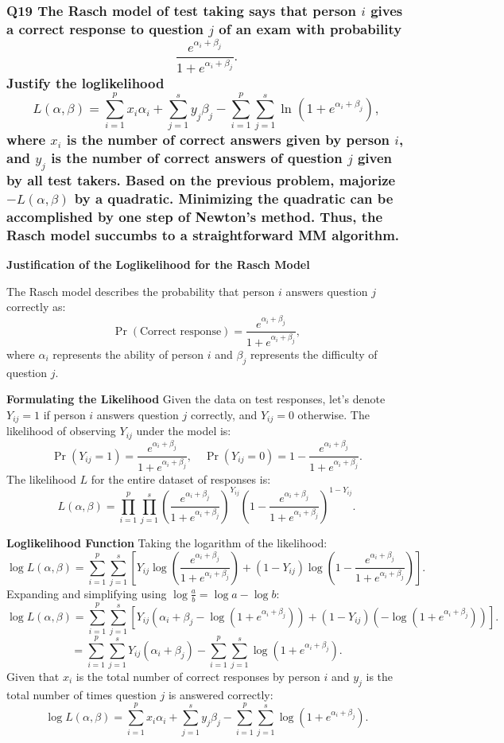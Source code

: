 \documentclass[8pt]{article}
\begin{document}
\subsubsection*{Q19 The Rasch model of test taking says that person \(i\) gives a correct response to question \(j\) of an exam with probability
\[
\frac{e^{\alpha_i + \beta_j}}{1 + e^{\alpha_i + \beta_j}}.
\]
Justify the loglikelihood
\[
L(\alpha, \beta) = \sum_{i=1}^p x_i \alpha_i + \sum_{j=1}^s y_j \beta_j - \sum_{i=1}^p \sum_{j=1}^s \ln(1 + e^{\alpha_i + \beta_j}),
\]
where \(x_i\) is the number of correct answers given by person \(i\), and \(y_j\) is the number of correct answers of question \(j\) given by all test takers. Based on the previous problem, majorize \(-L(\alpha, \beta)\) by a quadratic. Minimizing the quadratic can be accomplished by one step of Newton’s method. Thus, the Rasch model succumbs to a straightforward MM algorithm.}

\textbf{Justification of the Loglikelihood for the Rasch Model}

The Rasch model describes the probability that person \(i\) answers question \(j\) correctly as:
\[
\Pr(\text{Correct response}) = \frac{e^{\alpha_i + \beta_j}}{1 + e^{\alpha_i + \beta_j}},
\]
where \(\alpha_i\) represents the ability of person \(i\) and \(\beta_j\) represents the difficulty of question \(j\).

\textbf{Formulating the Likelihood}
Given the data on test responses, let's denote \(Y_{ij} = 1\) if person \(i\) answers question \(j\) correctly, and \(Y_{ij} = 0\) otherwise. The likelihood of observing \(Y_{ij}\) under the model is:
\[
\Pr(Y_{ij} = 1) = \frac{e^{\alpha_i + \beta_j}}{1 + e^{\alpha_i + \beta_j}}, \quad \Pr(Y_{ij} = 0) = 1 - \frac{e^{\alpha_i + \beta_j}}{1 + e^{\alpha_i + \beta_j}}.
\]
The likelihood \(L\) for the entire dataset of responses is:
\[
L(\alpha, \beta) = \prod_{i=1}^p \prod_{j=1}^s \left(\frac{e^{\alpha_i + \beta_j}}{1 + e^{\alpha_i + \beta_j}}\right)^{Y_{ij}} \left(1 - \frac{e^{\alpha_i + \beta_j}}{1 + e^{\alpha_i + \beta_j}}\right)^{1 - Y_{ij}}.
\]

\textbf{Loglikelihood Function}
Taking the logarithm of the likelihood:
\[
\log L(\alpha, \beta) = \sum_{i=1}^p \sum_{j=1}^s \left[ Y_{ij} \log \left(\frac{e^{\alpha_i + \beta_j}}{1 + e^{\alpha_i + \beta_j}}\right) + (1 - Y_{ij}) \log \left(1 - \frac{e^{\alpha_i + \beta_j}}{1 + e^{\alpha_i + \beta_j}}\right) \right].
\]
Expanding and simplifying using \(\log \frac{a}{b} = \log a - \log b\):
\[
\log L(\alpha, \beta) = \sum_{i=1}^p \sum_{j=1}^s \left[ Y_{ij} (\alpha_i + \beta_j - \log(1 + e^{\alpha_i + \beta_j})) + (1 - Y_{ij}) (-\log(1 + e^{\alpha_i + \beta_j})) \right].
\]
\[
= \sum_{i=1}^p \sum_{j=1}^s Y_{ij} (\alpha_i + \beta_j) - \sum_{i=1}^p \sum_{j=1}^s \log(1 + e^{\alpha_i + \beta_j}).
\]
Given that \(x_i\) is the total number of correct responses by person \(i\) and \(y_j\) is the total number of times question \(j\) is answered correctly:
\[
\log L(\alpha, \beta) = \sum_{i=1}^p x_i \alpha_i + \sum_{j=1}^s y_j \beta_j - \sum_{i=1}^p \sum_{j=1}^s \log(1 + e^{\alpha_i + \beta_j}).
\]
\end{document}
